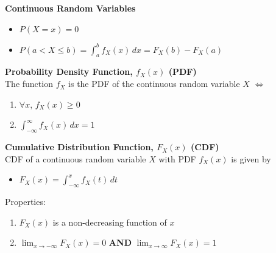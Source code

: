 \documentclass[a4paper, 12pt]{article}
\begin{document}
\begin{multicols*}{3}
\medskip

{\small\textbf{Continuous Random Variables}}
\begin{itemize}
    \item $P(X = x) = 0$
    \item $P(a < X \leq b) = \int_a^b f_X(x) \, dx = F_X(b) - F_X(a)$
\end{itemize}
\textbf{Probability Density Function, $f_X(x)$ (PDF)} \\
The function $f_X$ is the PDF of the continuous random variable $X$ $\iff$
\begin{enumerate}
    \item $\forall x$, $f_X(x) \geq 0$
    \item $\int_{-\infty}^{\infty} f_X(x) \, dx = 1$
\end{enumerate}
\textbf{Cumulative Distribution Function, $F_X(x)$ (CDF)} \\
CDF of a continuous random variable $X$ with PDF $f_X(x)$ is given by 
\begin{itemize}
    \item $F_X(x) = \int_{-\infty}^x f_X(t) \, dt$
\end{itemize}
Properties:
\begin{enumerate}
    \item $F_X(x)$ is a non-decreasing function of $x$
    \item $\lim_{x \rightarrow -\infty} F_X(x) = 0$ \textbf{AND} $\lim_{x \rightarrow \infty} F_X(x) = 1$
\end{enumerate}

\medskip


\end{multicols*}
\end{document}
